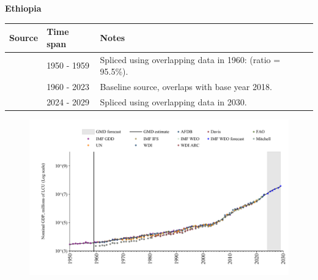 \documentclass[12pt,a4paper,landscape]{article}
\begin{document}
\begin{adjustbox}{max totalsize={\paperwidth}{\paperheight},center}
\begin{minipage}[t][\textheight][t]{\textwidth}
\vspace*{0.5cm}
{}
\begin{center}
{\Large\bfseries Ethiopia}
\end{center}
\vspace{0.5cm}
\begin{table}[H]
\centering
\small
\begin{tabular}{|l|l|l|}
\hline
\textbf{Source} & \textbf{Time span} & \textbf{Notes} \\
\hline
\rowcolor{white}\cite{IMF_GDD}& 1950 - 1959 &Spliced using overlapping data in 1960: (ratio = 95.5\%).\\
\rowcolor{lightgray}\cite{WDI}& 1960 - 2023 &Baseline source, overlaps with base year 2018.\\
\rowcolor{white}\cite{IMF_WEO_forecast}& 2024 - 2029 &Spliced using overlapping data in 2030.\\
\hline
\end{tabular}
\end{table}
\begin{figure}[H]
\centering
\includegraphics[width=\textwidth,height=0.6\textheight,keepaspectratio]{graphs/ETH_nGDP.pdf}
\end{figure}
\end{minipage}
\end{adjustbox}
\end{document}
